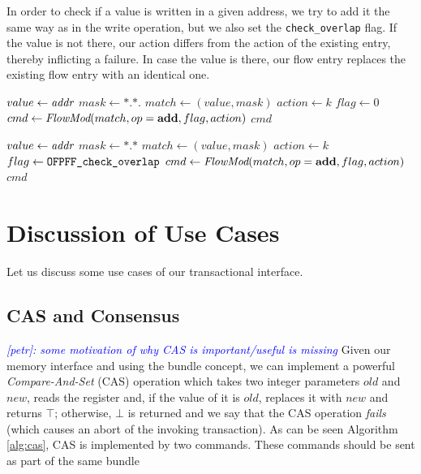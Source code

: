 \documentclass[conference]{sigcomm-alternate}
\newcommand{\concat}[0]{\cdot}
\newcommand{\compare}{compare\xspace}
\newcommand{\memwrite}{write\xspace}
\newcommand{\addr}{\emph{addr}\xspace}
\newcommand{\add}{\textbf{add}\xspace}
\newcommand{\checko}{\texttt{check\_overlap}\xspace}
\newcommand{\petr}[1]{\textit{\textcolor{blue}{[petr]: #1}}} %
\begin{document}
In order to check if a value is written in a given address,
we try to add it the same way as in the \memwrite operation,
but we also set the \texttt{\checko} flag. If the value is not there,
our action differs from the action of the existing entry,
thereby inflicting a failure.
In case the value is there, our flow entry replaces the existing flow entry
with an identical one.

\begin{algorithm}[h]
    \caption{$\textit{write}(\addr,k)$}
    \label{alg:write}
    \begin{algorithmic}[1]
    		\State $value \gets \addr$
    		\State $mask \gets  \texttt{*}. \texttt{*}.$
    		\State $match \gets (value,mask)$
    		\State $action \gets k$
    		\State $flag \gets 0$
    		\State $cmd\gets \emph{FlowMod}(match, op = \add, flag, action) $
			\Return $cmd$
    \end{algorithmic}
\end{algorithm}

\begin{algorithm}[h]
    \caption{$\textit{\compare}(\addr,k)$}
    \label{alg:compare}
    \begin{algorithmic}[1]
    		\State $value \gets \addr$
    		\State $mask \gets  \texttt{*}.\texttt{*}$
    		\State $match \gets (value,mask)$
    		\State $action \gets k$
    		\State $flag \gets \texttt{OFPFF\_\checko}$
    		\State $cmd\gets \emph{FlowMod}(match, op = \add, flag, action) $
			\Return $cmd$
    \end{algorithmic}
\end{algorithm}




\section{Discussion of Use Cases}\label{sec:apps}

Let us discuss some use cases of our transactional interface.

\subsection{CAS and Consensus}
\petr{ some motivation of why CAS is important/useful is missing}
Given our memory interface and using the bundle concept, we can implement
a powerful \emph{Compare-And-Set} (CAS) operation which takes two integer parameters
$\textit{old}$ and $\textit{new}$, reads the register and, if the
value of it is $\textit{old}$, replaces it with $\textit{new}$ and
returns $\top$; otherwise, $\bot$ is returned and
we say that the CAS operation \emph{fails} (which causes an abort of
the invoking transaction). As can be seen Algorithm \ref{alg:cas}, CAS is implemented by two commands. These commands should be sent as part of the same bundle
\end{document}

